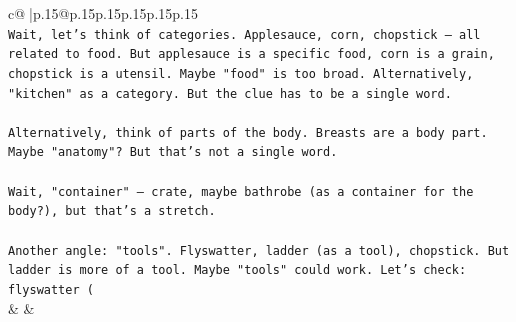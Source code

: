 \documentclass{article}
\begin{document}
{\begin{supertabular}{c@{$\;$}|p{.15\linewidth}@{}p{.15\linewidth}p{.15\linewidth}p{.15\linewidth}p{.15\linewidth}p{.15\linewidth}}
{{{\\ 
\texttt{Wait, let's think of categories. Applesauce, corn, chopstick – all related to food. But applesauce is a specific food, corn is a grain, chopstick is a utensil. Maybe "food" is too broad. Alternatively, "kitchen" as a category. But the clue has to be a single word. } \\
\\ 
\texttt{Alternatively, think of parts of the body. Breasts are a body part. Maybe "anatomy"? But that's not a single word. } \\
\\ 
\texttt{Wait, "container" – crate, maybe bathrobe (as a container for the body?), but that's a stretch. } \\
\\ 
\texttt{Another angle: "tools". Flyswatter, ladder (as a tool), chopstick. But ladder is more of a tool. Maybe "tools" could work. Let's check: flyswatter (} \\
            }
        }
    }
    & & \\ \\


\end{supertabular}}
\end{document}
